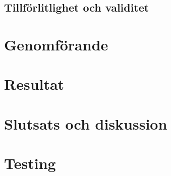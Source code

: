 \subsection{Tillförlitlighet och validitet}

\clearpage
\section{Genomförande}

\clearpage
\section{Resultat}

\clearpage
\section{Slutsats och diskussion}


\bilagor
\section{Testing}

\preenddocument

